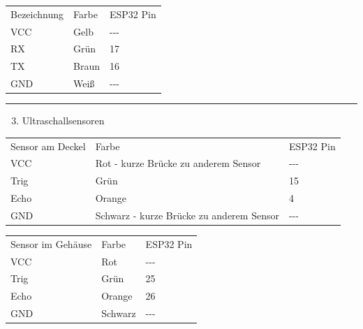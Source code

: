 \documentclass[
]{article}
\providecommand{\tightlist}{%
  \setlength{\itemsep}{0pt}\setlength{\parskip}{0pt}}
\begin{document}
{}

{}

\protect\hypertarget{t.1f25748bf503468b1e7bbd2d76883e77108db989}{}{}\protect\hypertarget{t.2}{}{}

\begin{longtable}[]{@{}lll@{}}
\toprule
\endhead
{Bezeichnung} & {Farbe} & {ESP32 Pin}\tabularnewline
{VCC} & {Gelb} & {-\/-\/-}\tabularnewline
{RX} & {Grün} & {17}\tabularnewline
{TX} & {Braun} & {16}\tabularnewline
{GND} & {Weiß} & {-\/-\/-}\tabularnewline
\bottomrule
\end{longtable}

\begin{center}\rule{0.5\linewidth}{0.5pt}\end{center}

{}

{}

{}

{}

\begin{enumerate}
\setcounter{enumi}{2}
\tightlist
\item
  {Ultraschallsensoren}
\end{enumerate}

{}

\protect\hypertarget{t.5c49095038b0b1a505dffa0c95a0f90e5dde1431}{}{}\protect\hypertarget{t.3}{}{}

\begin{longtable}[]{@{}lll@{}}
\toprule
\endhead
{Sensor am Deckel} & {Farbe} & {ESP32 Pin}\tabularnewline
{VCC} & {Rot - kurze Brücke zu anderem Sensor} &
{-\/-\/-}\tabularnewline
{Trig} & {Grün} & {15}\tabularnewline
{Echo} & {Orange} & {4}\tabularnewline
{GND} & {Schwarz - kurze Brücke zu anderem Sensor} &
{-\/-\/-}\tabularnewline
\bottomrule
\end{longtable}

{}

{}

\protect\hypertarget{t.c88803b3ec9656d93950427e71cffac21c21c201}{}{}\protect\hypertarget{t.4}{}{}

\begin{longtable}[]{@{}lll@{}}
\toprule
\endhead
{Sensor im Gehäuse} & {Farbe} & {ESP32 Pin}\tabularnewline
{VCC} & {Rot} & {-\/-\/-}\tabularnewline
{Trig} & {Grün} & {25}\tabularnewline
{Echo} & {Orange} & {26}\tabularnewline
{GND} & {Schwarz} & {-\/-\/-}\tabularnewline
\bottomrule
\end{longtable}

{}
\end{document}

